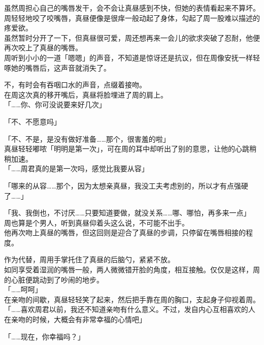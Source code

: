 虽然周担心自己的嘴唇发干，会不会让真昼感到不快，但她的表情看起来不算坏。周轻轻地咬了咬嘴唇，真昼便像是很痒一般动起了身体，勾起了周一股难以描述的疼爱欲。\\

虽然暂时分开了一下，但真昼很可爱，周还想再来一会儿的欲求突破了忍耐，他便再次咬上了真昼的嘴唇。\\

周听到小小的一道「嗯嗯」的声音，不知道是惊讶还是抗议，但在周像安抚一样轻啄她的嘴唇后，这声音就消失了。

不，有时会有吞咽口水的声音，点缀着接吻。\\

在周这次真的移开嘴后，真昼将脸埋进了周的肩上。\\

「……你、你可没说要来好几次」

「不、不愿意吗」

「不、不是，是没有做好准备……那个，很害羞的啦」\\

真昼轻轻嘟哝「明明是第一次」，可在周的耳中却听出了别的意思，让他的心跳稍稍加速。\\

「……周君真的是第一次吗，感觉比我要从容」

「哪来的从容……那个，因为太想亲真昼，我没工夫考虑别的，所以才有点强硬了……」

「我、我倒也，不讨厌……只要知道要做，就没关系……哪、哪怕，再多来一点」\\

周也算是个男人，听到真昼仰着头这么说，不可能不出手。\\

他再次吻上真昼的嘴唇，但这回则是迎合了真昼的步调，只停留在嘴唇相接的程度。

作为代替，周用手掌托住了真昼的后脑勺，紧紧不放。\\

如同享受着湿润的嘴唇一般，两人微微错开脸的角度，相互接触。仅仅是这样，周的心脏便跳动到了吵闹的地步。\\

「……呵呵」\\

在亲吻的间歇，真昼轻轻笑了起来，然后把手靠在周的胸口，支起身子仰视着周。\\

「……喜欢周君以前，我还不知道亲吻有什么意义。不过，发自内心互相喜欢的人在亲吻的时候，大概会有非常幸福的心情吧」

「……现在，你幸福吗？」

